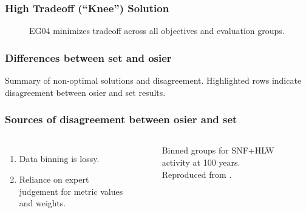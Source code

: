 \begin{frame}
  \frametitle{High Tradeoff (``Knee'') Solution}
        
  \begin{figure}[htbp!]
    \begin{center}
      \resizebox{0.9\columnwidth}{!}{}
    \end{center}
          \caption{EG04 minimizes tradeoff across all objectives and evaluation groups.}
    \label{fig:single-eg-pcp}
  \end{figure}
\end{frame}

\begin{frame}
  \frametitle{Differences between \gls{set} and \gls{osier}}
    \begin{table}
        \centering
        \caption{Summary of non-optimal solutions and disagreement. Highlighted
        rows indicate disagreement between \Gls{osier} and \Gls{set} results.}
        \label{tab:non-optimal-subset}
        \resizebox{\columnwidth}{!}{}
    \end{table}
\end{frame}

\begin{frame}
  \frametitle{Sources of disagreement between \gls{osier} and \gls{set}}
    \begin{columns}
        \column[t]{3.5cm}
            \begin{enumerate}
                \item Data binning is lossy.
                \item Reliance on expert judgement for metric values and
                weights.
            \end{enumerate}
        \pause        
        \column[t]{6.5cm}
          \begin{figure}[htbp!]
            \begin{center}
            \resizebox{\columnwidth}{!}{}
            \end{center}
                \caption{Binned groups for SNF+HLW activity at 100 years.
                Reproduced from \cite{wigeland_nuclear_2014}.}
            \label{fig:set_activity_bin2}
        \end{figure}
    \end{columns}
\end{frame}

